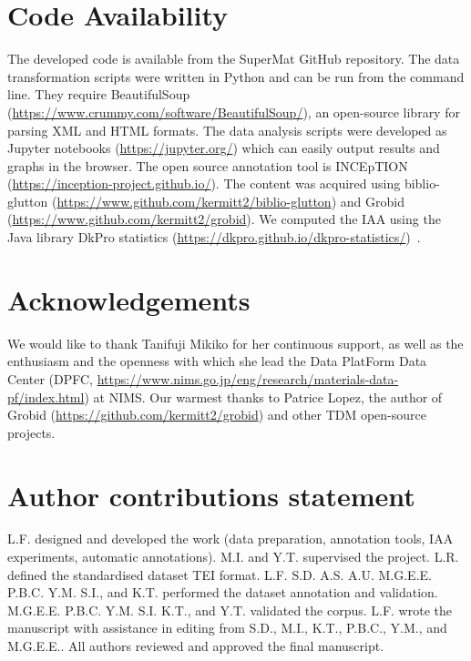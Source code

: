 \documentclass[fleqn,10pt]{wlscirep}
\begin{document}
\section*{Code Availability}
\label{sec:code-availability}
The developed code is available from the SuperMat GitHub repository. The data transformation scripts were written in Python and can be run from the command line. 
They require BeautifulSoup  (\url{https://www.crummy.com/software/BeautifulSoup/}), an open-source library for parsing XML and HTML formats. 
The data analysis scripts were developed as Jupyter notebooks (\url{https://jupyter.org/}) which can easily output results and graphs in the browser. 
The open source annotation tool is INCEpTION (\url{https://inception-project.github.io/}). 
The content was acquired using biblio-glutton (\url{https://www.github.com/kermitt2/biblio-glutton}) and Grobid (\url{https://www.github.com/kermitt2/grobid}).
We computed the IAA using the Java library DkPro statistics (\url{https://dkpro.github.io/dkpro-statistics/})~\cite{Meyer2014DKProAA}.

  

\section*{Acknowledgements}

We would like to thank Tanifuji Mikiko for her continuous support, as well as the enthusiasm and the openness with which she lead the Data PlatForm Data Center (DPFC, \url{https://www.nims.go.jp/eng/research/materials-data-pf/index.html}) at NIMS.
Our warmest thanks to Patrice Lopez, the author of Grobid (\url{https://github.com/kermitt2/grobid}) and other TDM open-source projects. 

\section*{Author contributions statement}

L.F. designed and developed the work (data preparation, annotation tools, IAA experiments, automatic annotations). M.I. and Y.T. supervised the project.
L.R. defined the standardised dataset TEI format.
L.F. S.D. A.S. A.U. M.G.E.E. P.B.C. Y.M. S.I., and K.T. performed the dataset annotation and validation.
M.G.E.E. P.B.C. Y.M. S.I. K.T., and Y.T. validated the corpus.
L.F. wrote the manuscript with assistance in editing from S.D., M.I., K.T., P.B.C., Y.M., and  M.G.E.E.. 
All authors reviewed and approved the final manuscript. 
\end{document}
